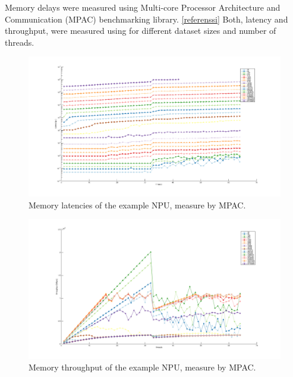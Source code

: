 Memory delays were measured using Multi-core Processor Architecture and Communication (MPAC) benchmarking library. \ref{referenssi} Both, latency and throughput, were measured using for different dataset sizes and number of threads.

\begin{figure}[h]
  \begin{center}
    \includegraphics[width=\textwidth]{images/mem-latency.pdf}
    \caption{Memory latencies of the example NPU, measure by MPAC.}
    \label{fig:mem-latency}
  \end{center}
\end{figure}


\begin{figure}[h]
  \begin{center}
    \includegraphics[width=\textwidth]{images/mem-throughput.pdf}
    \caption{Memory throughput of the example NPU, measure by MPAC.}
    \label{fig:mem-throughput}
  \end{center}
\end{figure}

